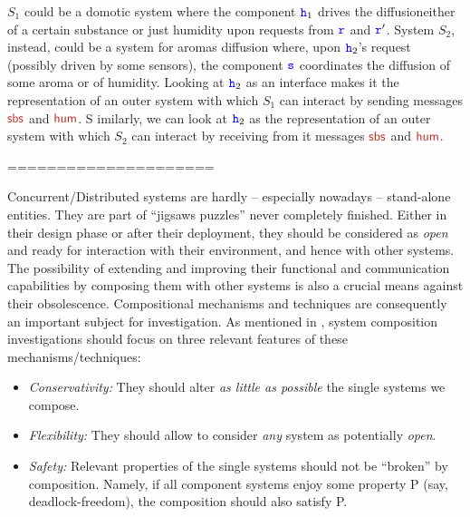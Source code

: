 \noindent
$S_1$ could be a domotic system where the component ${\mathtt{\color{blue}{ {h}}}}_1$ drives the diffusioneither of a certain substance or just humidity upon requests from ${\mathtt{\color{blue}{ {r}}}}$ and ${\mathtt{\color{blue}{ {r}}}}'$.
System $S_2$, instead, could be a system for aromas diffusion where, upon ${\mathtt{\color{blue}{ {h}}}}_2$'s request
(possibly driven by some sensors), 
the component ${\mathtt{\color{blue}{ {s}}}}$ coordinates the diffusion of some aroma or of humidity.  
 Looking at ${\mathtt{\color{blue}{ {h}}}}_2$ as an interface makes it the representation of an outer system with which
 $S_1$ can interact by sending messages $\msg[sbs]$ and $\msg[hum]$. S
 imilarly, we can look at ${\mathtt{\color{blue}{ {h}}}}_2$ as the
 representation of an outer system with which
 $S_2$ can interact by receiving from it messages $\msg[sbs]$ and $\msg[hum]$.
 
 =====================
 
 
 

Concurrent/Distributed systems are  hardly -- especially nowadays -- 
stand-alone entities. They are part of 
``jigsaws puzzles''  
never completely  finished.
Either in their design phase or after their deployment, they should be considered
as {\em open} and  ready for interaction with their environment, and hence with other systems. 
The possibility of extending and improving their functional and communication capabilities
by composing them
with other systems is also a crucial means %
against their obsolescence.
Compositional mechanisms and techniques are consequently an important subject for investigation.
As mentioned in \cite{BDGY23}, system composition investigations should focus on three relevant features
of these mechanisms/techniques:
\begin{itemize}
\item
{\em Conservativity:} 
They should alter {\em as little as possible} the single systems we compose.
\item
{\em Flexibility:} 
%
 They should allow to consider {\em any} system as potentially {\em open}.
\item
{\em Safety:}
Relevant properties of the single systems should not be ``broken'' by composition.
 Namely, if all component systems enjoy some property P (say, deadlock-freedom), the composition should also satisfy P. 
\end{itemize} 


